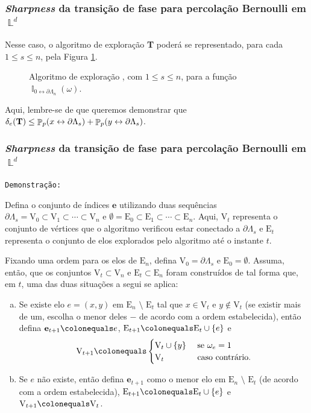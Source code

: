 \documentclass[9pt]{beamer}
\theoremstyle{definition} %
\DeclareMathOperator{\PX}{\mathbb{P}} %
\DeclareMathOperator{\IX}{\mathbb{I}} %
\DeclareMathOperator{\LX}{\mathbb{L}} %
\begin{document}
	\begin{frame}[t]
	\frametitle{\textit{Sharpness} da transição de fase para percolação Bernoulli em $\LX^d$}
		Nesse caso, o algoritmo de exploração \textbf{T} poderá se representado, para cada $1 \leq s \leq n$, pela Figura \ref{fig:caixa-s}.
		\vspace{6pt}
		\begin{figure}
			
			\vspace{-6pt}
			\caption{\justifying Algoritmo de exploração , com $1 \leq s \leq n$, para a função $\IX_{0\leftrightarrow\partial\Lambda_n}(\omega)$.}
			\label{fig:caixa-s}
		\end{figure}
		
		\vspace{-6pt}
		Aqui, lembre-se de que queremos demonstrar que $\delta_e(\text{\textbf{T}}) \leq \PX_p(x \leftrightarrow \partial\Lambda_s) + \PX_p(y \leftrightarrow \partial\Lambda_s)$.
	\end{frame}

	\begin{frame}[t]
		\frametitle{\textit{Sharpness} da transição de fase para percolação Bernoulli em $\LX^d$}
		\texttt{Demonstração:}
		
		Defina o conjunto de índices $\mathbf{e}$ utilizando duas sequências $\partial\Lambda_s = \text{V}_0 \subset \text{V}_1 \subset \cdots \subset \text{V}_n$ e $\emptyset = \text{E}_0 \subset \text{E}_1 \subset \cdots \subset \text{E}_n$. Aqui, $\text{V}_t$ representa o conjunto de vértices que o algoritmo verificou estar conectado a $\partial\Lambda_s$ e $\text{E}_t$ representa o conjunto de elos explorados pelo algoritmo até o instante $t$.\pause
		
		Fixando uma ordem para os elos de $\text{E}_n$, defina $\text{V}_0 = \partial\Lambda_s$ e $\text{E}_0 = \emptyset$. Assuma, então, que os conjuntos $\text{V}_t \subset \text{V}_n$ e $\text{E}_t \subset \text{E}_n$ foram construídos de tal forma que, em $t$, uma das duas situações a segui se aplica:
		
		\begin{enumerate}[a.]
			\item Se existe elo $e = (x, y)$ em $\text{E}_n \text{~\textbackslash~} \text{E}_t$ tal que $x \in \text{V}_t$ e $y \not\in \text{V}_t$ (se existir mais de um, escolha o menor deles $-$ de acordo com a ordem estabelecida), então defina $\mathbf{e}_{t+1} \colonequals e$, $\text{E}_{t + 1} \colonequals \text{E}_t \cup \{e\}$ e
			\[ \text{V}_{t + 1} \colonequals
			\begin{cases}
			\text{V}_t \cup \{y\} &\text{ se } \omega_e = 1 \\
			\text{V}_t &\text{ caso contrário}.
			\end{cases}
			\]
			\item Se $e$ não existe, então defina $\mathbf{e}_{t+1}$ como o menor elo em $\text{E}_n \text{~\textbackslash~} \text{E}_t$ (de acordo com a ordem estabelecida), $\text{E}_{t + 1} \colonequals \text{E}_t \cup \{e\}$ e $\text{V}_{t + 1} \colonequals \text{V}_t$.
		\end{enumerate}
	\end{frame}
\end{document}
